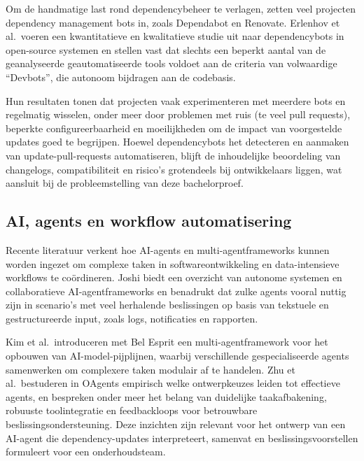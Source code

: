 Om de handmatige last rond dependencybeheer te verlagen, zetten veel projecten dependency management bots in, zoals Dependabot en Renovate.\autocite{Erlenhov2022} Erlenhov et al.\ voeren een kwantitatieve en kwalitatieve studie uit naar dependencybots in open-source systemen en stellen vast dat slechts een beperkt aantal van de geanalyseerde geautomatiseerde tools voldoet aan de criteria van volwaardige ``Devbots'', die autonoom bijdragen aan de codebasis.\autocite{Erlenhov2022}

Hun resultaten tonen dat projecten vaak experimenteren met meerdere bots en regelmatig wisselen, onder meer door problemen met ruis (te veel pull requests), beperkte configureerbaarheid en moeilijkheden om de impact van voorgestelde updates goed te begrijpen.\autocite{Erlenhov2022} Hoewel dependencybots het detecteren en aanmaken van update-pull-requests automatiseren, blijft de inhoudelijke beoordeling van changelogs, compatibiliteit en risico's grotendeels bij ontwikkelaars liggen, wat aansluit bij de probleemstelling van deze bachelorproef.\autocite{Erlenhov2022,Pashchenko2018}

\subsection{AI, agents en workflow automatisering}

Recente literatuur verkent hoe AI-agents en multi-agentframeworks kunnen worden ingezet om complexe taken in softwareontwikkeling en data-intensieve workflows te coördineren.\autocite{Joshi2025,Kim2024,Zhu2025} Joshi biedt een overzicht van autonome systemen en collaboratieve AI-agentframeworks en benadrukt dat zulke agents vooral nuttig zijn in scenario's met veel herhalende beslissingen op basis van tekstuele en gestructureerde input, zoals logs, notificaties en rapporten.\autocite{Joshi2025}

Kim et al.\ introduceren met Bel Esprit een multi-agentframework voor het opbouwen van AI-model-pijplijnen, waarbij verschillende gespecialiseerde agents samenwerken om complexere taken modulair af te handelen.\autocite{Kim2024} Zhu et al.\ bestuderen in OAgents empirisch welke ontwerpkeuzes leiden tot effectieve agents, en bespreken onder meer het belang van duidelijke taakafbakening, robuuste toolintegratie en feedbackloops voor betrouwbare beslissingsondersteuning.\autocite{Zhu2025} Deze inzichten zijn relevant voor het ontwerp van een AI-agent die dependency-updates interpreteert, samenvat en beslissingsvoorstellen formuleert voor een onderhoudsteam.

